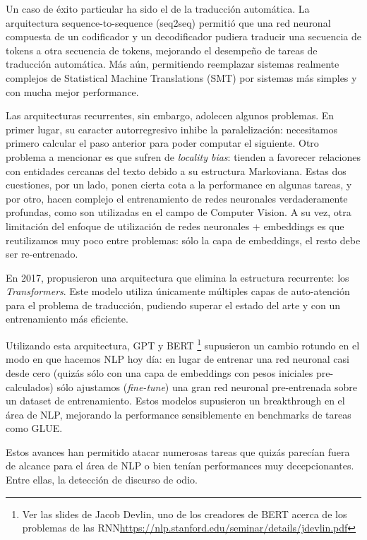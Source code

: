 Un caso de éxito particular ha sido el de la traducción automática. La arquitectura sequence-to-sequence (seq2seq) \cite{sutskever2014sequence} permitió que una red neuronal compuesta de un codificador y un decodificador pudiera traducir una secuencia de tokens a otra secuencia de tokens, mejorando el desempeño de tareas de traducción automática. Más aún, permitiendo reemplazar sistemas realmente complejos de Statistical Machine Translations (SMT) por sistemas más simples y con mucha mejor performance.

Las arquitecturas recurrentes, sin embargo, adolecen algunos problemas. En primer lugar, su caracter autorregresivo inhibe la paralelización: necesitamos primero calcular el paso anterior para poder computar el siguiente. Otro problema a mencionar es que sufren de \emph{locality bias}: tienden a favorecer relaciones con entidades cercanas del texto debido a su estructura Markoviana. Estas dos cuestiones, por un lado, ponen cierta cota a la performance en algunas tareas, y por otro, hacen complejo el entrenamiento de redes neuronales verdaderamente profundas, como son utilizadas en el campo de Computer Vision. A su vez, otra limitación del enfoque de utilización de redes neuronales + embeddings es que reutilizamos muy poco entre problemas: sólo la capa de embeddings, el resto debe ser re-entrenado.

En 2017, \citet{vaswani2017attention} propusieron una arquitectura que elimina la estructura recurrente: los \emph{Transformers}. Este modelo utiliza únicamente múltiples capas de auto-atención para el problema de traducción, pudiendo superar el estado del arte y con un entrenamiento más eficiente.

Utilizando esta arquitectura, GPT y BERT
\footnote{Ver las slides de Jacob Devlin, uno de los creadores de BERT acerca de los problemas de las RNN\url{https://nlp.stanford.edu/seminar/details/jdevlin.pdf}} supusieron un cambio rotundo en el modo en que hacemos NLP hoy día: en lugar de entrenar una red neuronal casi desde cero (quizás sólo con una capa de embeddings con pesos iniciales pre-calculados) sólo ajustamos (\emph{fine-tune}) una gran red neuronal pre-entrenada sobre un dataset de entrenamiento. Estos modelos supusieron un breakthrough en el área de NLP, mejorando la performance sensiblemente en benchmarks de tareas como GLUE.

Estos avances han permitido atacar numerosas tareas que quizás parecían fuera de alcance para el área de NLP o bien tenían performances muy decepcionantes. Entre ellas, la detección de discurso de odio.

